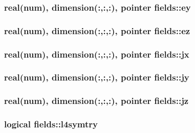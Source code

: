 \subsubsection[{\texorpdfstring{ey}{ey}}]{\setlength{\rightskip}{0pt plus 5cm}real(num), dimension(\+:,\+:,\+:), pointer fields\+::ey}\hypertarget{namespacefields_a416c4dba2dc5fb0ac7cbeb6bdbaffc2c}{}\label{namespacefields_a416c4dba2dc5fb0ac7cbeb6bdbaffc2c}
\subsubsection[{\texorpdfstring{ez}{ez}}]{\setlength{\rightskip}{0pt plus 5cm}real(num), dimension(\+:,\+:,\+:), pointer fields\+::ez}\hypertarget{namespacefields_a0fa6f30ad153ef0e52f181d70e3b92e1}{}\label{namespacefields_a0fa6f30ad153ef0e52f181d70e3b92e1}
\subsubsection[{\texorpdfstring{jx}{jx}}]{\setlength{\rightskip}{0pt plus 5cm}real(num), dimension(\+:,\+:,\+:), pointer fields\+::jx}\hypertarget{namespacefields_ab4aadb2986a77b2c2546cee63c380fca}{}\label{namespacefields_ab4aadb2986a77b2c2546cee63c380fca}
\subsubsection[{\texorpdfstring{jy}{jy}}]{\setlength{\rightskip}{0pt plus 5cm}real(num), dimension(\+:,\+:,\+:), pointer fields\+::jy}\hypertarget{namespacefields_aacf6032b8f949c35388351665b007c93}{}\label{namespacefields_aacf6032b8f949c35388351665b007c93}
\subsubsection[{\texorpdfstring{jz}{jz}}]{\setlength{\rightskip}{0pt plus 5cm}real(num), dimension(\+:,\+:,\+:), pointer fields\+::jz}\hypertarget{namespacefields_ad1f49be91f74095a76edaa8ff8c26c8c}{}\label{namespacefields_ad1f49be91f74095a76edaa8ff8c26c8c}
\subsubsection[{\texorpdfstring{l4symtry}{l4symtry}}]{\setlength{\rightskip}{0pt plus 5cm}logical fields\+::l4symtry}\hypertarget{namespacefields_afcffe2f0f052e32d9e264c035db32bde}{}\label{namespacefields_afcffe2f0f052e32d9e264c035db32bde}
